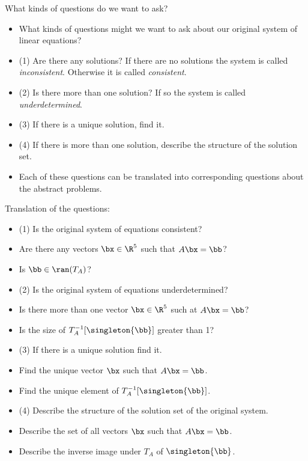 \documentclass{beamer}
\begin{document}

\begin{frame}{What kinds of questions do we want to ask?}

\begin{itemize}
\item What kinds of questions might we want to ask about our original system of linear equations?
\item (1) Are there any solutions?
If there are no solutions the system is called \emph{inconsistent}. Otherwise it is called \emph{consistent}.
\item (2) Is there more than one solution? If so the system is called
\emph{underdetermined}.
\item (3) If there is a unique solution, find it.
\item (4) If there is more than one solution, describe the structure of the
solution set.
\item Each of these questions can be translated into corresponding questions
about the abstract problems.
\end{itemize}

\end{frame}


\begin{frame}{Translation of the questions:}

\begin{itemize}
\item (1) Is the original system of equations consistent?
\item Are there any vectors $\bx\in\R^5$ such that $A \bx = \bb$?
\item Is $\bb\in\ran(T_A)$?
\item (2) Is the original system of equations underdetermined?
\item Is there more than one vector $\bx\in\R^5$ such at $A \bx = \bb$?
\item Is the size of $T_A^{-1}[\singleton{\bb}]$ greater than 1?
\item (3) If there is a unique solution find it.
\item Find the unique vector $\bx$ such that $A\bx = \bb$.
\item Find the unique element of $T_A^{-1}[\singleton{\bb}]$.
\item (4) Describe the structure of the solution set of the original system.
\item Describe the set of all vectors $\bx$ such that $A\bx = \bb$.
\item Describe the inverse image under $T_A$ of $\singleton{\bb}$.

\end{itemize}

\end{frame}

\end{document}
